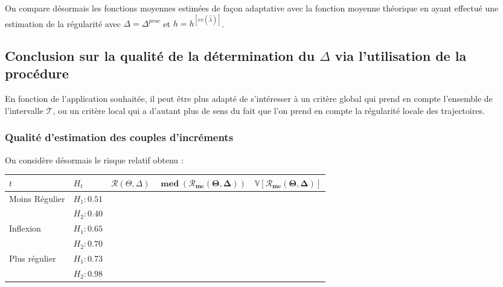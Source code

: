 On compare désormais les fonctions moyennes estimées de façon adaptative avec la fonction moyenne théorique en ayant effectué une estimation de la régularité avec $\Delta = \Delta^{proc}$ et $h = h^{[cv(\widehat \lambda)]}$.


\subsection{Conclusion sur la qualité de la détermination du $\Delta$ via l'utilisation de la procédure}

En fonction de l'application souhaitée, il peut être plus adapté de s'intéresser à un critère global qui prend en compte l'ensemble de l'intervalle $\mathcal T$, ou un critère local qui a d'autant plus de sens du fait que l'on prend en compte la régularité locale des trajectoires.
\subsubsection{Qualité d'estimation des couples d'incréments}

On considère désormais le risque relatif obtenu :

\begin{table}[H]
	\centering
	\begin{tabularx}{\textwidth}{|X|X|X|X|X|}
		\toprule
		$t$                                  & $H_t$        & $\mathcal R(\Theta, \Delta)$ & $\mathbf{\operatorname{med}(\mathcal R_{mc}(\Theta, \Delta))}$ & $\mathbf{\mathds V[\mathcal R_{mc}(\Theta, \Delta)]}$ \\
		\midrule
		\multirow{2}{\hsize}{Moins Régulier} & $H_1 : 0.51$ &                              &                                                                &
		\\
		                                     & $H_2 : 0.40$ &                              &                                                                &
		\\
		\midrule
		\multirow{2}{\hsize}{Inflexion}      & $H_1 : 0.65$ &                              &                                                                &
		\\
		                                     & $H_2 : 0.70$ &                              &                                                                &
		\\
		\midrule
		\multirow{2}{\hsize}{Plus régulier}  & $H_1 : 0.73$ &                              &                                                                &
		\\
		                                     & $H_2 : 0.98$ &                              &                                                                &
		\\
		\bottomrule
	\end{tabularx}
\end{table}


